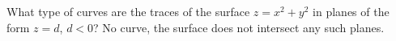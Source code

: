 {What type of curves are the traces of the surface $z=x^2+y^2$ in planes of the form $z=d$, $d<0$?
}
{No curve, the surface does not intersect any such planes.
}
